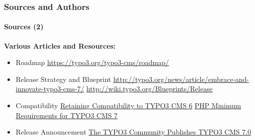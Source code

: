 \begin{frame}[fragile]
	\frametitle{Sources and Authors}
	\framesubtitle{Sources (2)}

	\textbf{Various Articles and Resources:}
		\begin{itemize}\smaller

			\item Roadmap\newline
				\url{https://typo3.org/typo3-cms/roadmap/}
			\item Release Strategy and Blueprint\newline
				\url{http://typo3.org/news/article/embrace-and-innovate-typo3-cms-7/}
				\url{http://wiki.typo3.org/Blueprints/Release}
			\item Compatibility\newline
				\href{http://typo3.org/news/article/retaining-compatibility-to-typo3-cms6/}{Retaining Compatibility to TYPO3 CMS 6}\newline
				\href{http://typo3.org/news/article/php-minimum-requirements-for-typo3-cms-7/}{PHP Minimum Requirements for TYPO3 CMS 7}
			\item Release Announcement\newline
				\href{http://typo3.org/news/article/the-typo3-community-publishes-typo3-cms-70-a-new-version-of-its-free-content-management-system/}{The TYPO3 Community Publishes TYPO3 CMS 7.0}

		\end{itemize}

\end{frame}


